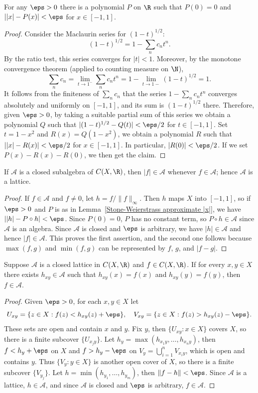 \begin{lemma}\label{Stone-Weierstrass approximate |x|}
For any $\eps>0$ there is a polynomial $P$ on $\R$ such that $P(0)=0$ and $||x|-P(x)|<\eps$ for $x\in[-1,1]$.
\end{lemma}
\begin{proof}
Consider the Maclaurin series for $(1-t)^{1/2}$:
\[(1-t)^{1/2}=1-\sum_nc_nt^n.\]
By the ratio test, this series converges for $|t|<1$. Moreover, by the monotone convergence theorem (applied to counting measure on $\N$),
\[\sum_nc_n=\lim_{t\to 1^-}\sum_nc_nt^n=1-\lim_{t\to 1-}(1-t)^{1/2}=1.\]
It follows from the finiteness of $\sum_nc_n$ that the series $1-\sum_nc_nt^n$ converges absolutely and uniformly on $[-1,1]$, and its sum is $(1-t)^{1/2}$ there. Therefore, given $\eps>0$, by taking a suitable partial sum of this series we obtain a polynomial $Q$ such that $|(1-t)^{1/2}-Q(t)|<\eps/2$ for $t\in[-1,1]$. Set $t=1-x^2$ and $R(x)=Q(1-x^2)$, we obtain a polynomial $R$ such that $||x|-R(x)|<\eps/2$ for $x\in[-1,1]$. In particular, $|R(0)|<\eps/2$. If we set $P(x)-R(x)-R(0)$, we then get the claim. 
\end{proof}
\begin{lemma}\label{Stone-Weierstrass closed subalgebra is lattice}
If $\mathscr{A}$ is a closed subalgebra of $C(X,\R)$, then $|f|\in\mathscr{A}$ whenever $f\in\mathscr{A}$; hence $\mathscr{A}$ is a lattice.
\end{lemma}
\begin{proof}
If $f\in\mathscr{A}$ and $f\neq 0$, let $h=f/\|f\|_\infty$. Then $h$ maps $X$ into $[-1,1]$, so if $\eps>0$ and $P$ is as in Lemma~\ref{Stone-Weierstrass approximate |x|}, we have $||h|-P\circ h|<\eps$. Since $P(0)=0$, $P$ has no constant term, so $P\circ h\in\mathscr{A}$ since $\mathscr{A}$ is an algebra. Since $\mathscr{A}$ is closed and $\eps$ is arbitrary, we have $|h|\in\mathscr{A}$ and hence $|f|\in\mathscr{A}$. This proves the first assertion, and the second one follows because $\max(f,g)$ and $\min(f,g)$ can be represented by $f$, $g$, and $|f-g|$.
\end{proof}
\begin{lemma}\label{Stone-Weierstrass two point}
Suppose $\mathscr{A}$ is a closed lattice in $C(X,\R)$ and $f\in C(X,\R)$. If for every $x,y\in X$ there exists $h_{xy}\in\mathscr{A}$ such that $h_{xy}(x)=f(x)$ and $h_{xy}(y)=f(y)$, then $f\in\mathscr{A}$.
\end{lemma}
\begin{proof}
Given $\eps>0$, for each $x,y\in X$ let
\[U_{xy}=\{z\in X:f(z)<h_{xy}(z)+\eps\},\quad V_{xy}=\{z\in X:f(z)>h_{xy}(z)-\eps\}.\]
These sets are open and contain $x$ and $y$. Fix $y$, then $\{U_{xy}:x\in X\}$ covers $X$, so there is a finite subcover $\{U_{x_jy}\}$. Let $h_y=\max(h_{x_1y},\dots,h_{x_ny})$, then $f<h_y+\eps$ on $X$ and $f>h_y-\eps$ on $V_y=\bigcup_{i=1}^{n}V_{x_iy}$, which is open and contains $y$. Thus $\{V_y:y\in X\}$ is another open cover of $X$, so there is a finite subcover $\{V_{y_j}\}$. Let $h=\min(h_{y_1},\dots,h_{y_m})$, then $\|f-h\|<\eps$. Since $\mathscr{A}$ is a lattice, $h\in\mathscr{A}$, and since $\mathscr{A}$ is closed and $\eps$ is arbitrary, $f\in\mathscr{A}$.
\end{proof}
